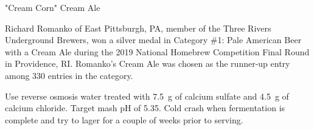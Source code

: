 \stylesection{\stylecreamale}

\begin{recipie}{"Cream Corn" Cream Ale}

\begin{aboutblock}
Richard Romanko of East Pittsburgh, PA, member of the Three Rivers Underground Brewers,
won a silver medal in Category \#1: Pale American Beer with a Cream Ale during the 2019
National Homebrew Competition Final Round in Providence, RI. Romanko's Cream Ale was
chosen as the runner-up entry among 330 entries in the category. \sourceaha
\end{aboutblock}
 

\begin{methodandtiming}
 
\begin{mashsteps}
\end{mashsteps}

\begin{directions}
Use reverse osmosis water treated with 7.5~g of calcium sulfate and 4.5~g of calcium
chloride. Target mash pH of 5.35. Cold crash when fermentation is complete and
try to lager for a couple of weeks prior to serving.
\end{directions}

\end{methodandtiming}

\pagebreak

\begin{ingredientsblock}

\begin{malts}
\end{malts}

\begin{hops}
\end{hops}


\end{ingredientsblock}

\end{recipie}
